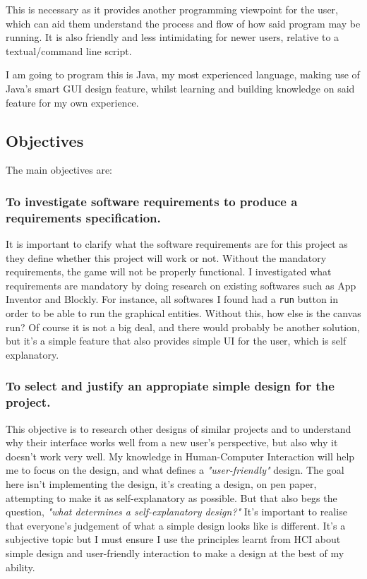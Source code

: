 \documentclass[a4paper, 12pt]{article}
\begin{document}
            This is necessary as it provides another programming viewpoint for the user,
            which can aid them understand the process and flow of how said program may
            be running. It is also friendly and less intimidating for newer users,
            relative to a textual/command line script.
            
            I am going to program this is Java, my most experienced language, making use
            of Java's smart GUI design feature, whilst learning and building knowledge on
            said feature for my own experience.

        \subsection{Objectives}
            The main objectives are:

            \subsubsection{To investigate software requirements to produce a requirements
            specification.}
                It is important to clarify what the software requirements are for this project as they
                define whether this project will work or not. Without the mandatory requirements,
                the game will not be properly functional. I investigated what requirements are mandatory
                by doing research on existing softwares such as App Inventor and Blockly. For instance,
                all softwares I found had a \texttt{run} button in order to be able to run the graphical
                entities. Without this, how else is the canvas run? Of course it is not a big deal, and
                there would probably be another solution, but it's a simple feature that also provides
                simple UI for the user, which is self explanatory.

            \subsubsection{To select and justify an appropiate simple design for the
            project.}
                This objective is to research other designs of similar projects and to understand
                why their interface works well from a new user's perspective, but also why it
                doesn't work very well. My knowledge in Human-Computer Interaction will help me
                to focus on the design, and what defines a \textit{"user-friendly"} design.
                The goal here isn't implementing the design, it's creating a design, on pen paper,
                attempting to make it as self-explanatory as possible. But that also begs the question,
                \textit{"what determines a self-explanatory design?"} It's important to realise that
                everyone's judgement of what a simple design looks like is different. It's a subjective
                topic but I must ensure I use the principles learnt from HCI about simple design and
                user-friendly interaction to make a design at the best of my ability.
            
\end{document}
